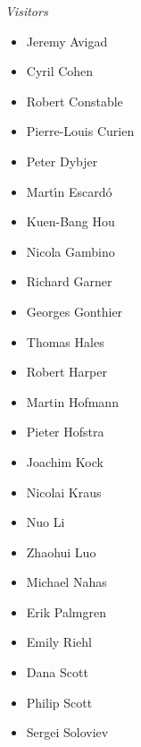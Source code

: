 
\centerline{\emph{Visitors}}
%
\begin{multicols}{3}{
\begin{itemize}
\item[] Jeremy Avigad
\item[] Cyril Cohen
\item[] Robert Constable
\item[] Pierre-Louis Curien
\item[] Peter Dybjer
\item[] Mart{\'\i}n Escard{\'o}
\item[] Kuen-Bang Hou
\item[] Nicola Gambino
\item[] Richard Garner
\item[] Georges Gonthier
\item[] Thomas Hales
\item[] Robert Harper
\item[] Martin Hofmann
\item[] Pieter Hofstra
\item[] Joachim Kock
\item[] Nicolai Kraus
\item[] Nuo Li
\item[] Zhaohui Luo
\item[] Michael Nahas
\item[] Erik Palmgren
\item[] Emily Riehl
\item[] Dana Scott
\item[] Philip Scott
\item[] Sergei Soloviev
\end{itemize}
}
\end{multicols}

